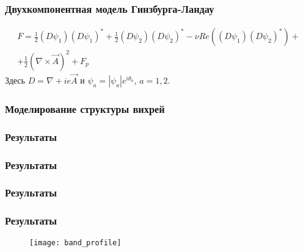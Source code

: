 \begin{frame}
    \frametitle{Двухкомпонентная модель Гинзбурга-Ландау}
    \begin{gather}
        F = \frac{1}{2}(D\psi_1)(D\psi_1)^* + 
            \frac{1}{2}(D\psi_2)(D\psi_2)^* -
            \nu Re\left( (D\psi_1)(D\psi_2)^* \right) + \nonumber \\ +
            \frac{1}{2}\left(\nabla\times\vec{A}\right)^2 + F_p
    \end{gather}
    Здесь \( D = \nabla + ie\vec{A} \) и \( \psi_a = |\psi_a|e^{i\theta_a} \), 
    \( a = 1,2 \).
\end{frame}

\begin{frame}
    \frametitle{Моделирование структуры вихрей}
\end{frame}

\begin{frame}
    \frametitle{Результаты}
    \begin{figure}[h]
        \begin{minipage}[h]{0.49\linewidth}
            \center{\texttt{[image: 3d\_B]}}
        \end{minipage}
        \hfill
        \begin{minipage}[h]{0.49\linewidth}
        \end{minipage}
    \end{figure}
\end{frame}

\begin{frame}
    \frametitle{Результаты}
    \begin{figure}[h]
        \begin{minipage}[h]{0.49\linewidth}
            \center{\texttt{[image: 3d\_F1]}}
        \end{minipage}
        \hfill
        \begin{minipage}[h]{0.49\linewidth}
        \end{minipage}
    \end{figure}
\end{frame}

\begin{frame}
    \frametitle{Результаты}
    \begin{figure}[h]
        \begin{minipage}[h]{0.49\linewidth}
            \center{\texttt{[image: 3d\_F2]}}
        \end{minipage}
        \hfill
        \begin{minipage}[h]{0.49\linewidth}
        \end{minipage}
    \end{figure}
\end{frame}

\begin{frame}
    \frametitle{Результаты}
    \begin{figure}[h]
        \center
        \texttt{[image: band\_profile]}
    \end{figure}
\end{frame}